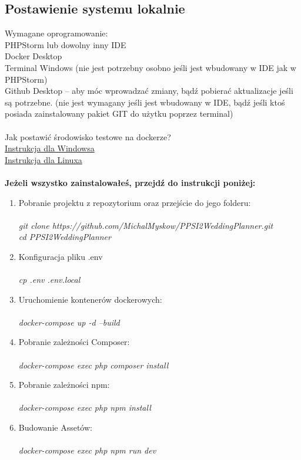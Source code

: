 \documentclass{article}
\begin{document}
\subsection{Postawienie systemu lokalnie}
Wymagane oprogramowanie:\\
PHPStorm lub dowolny inny IDE\\
Docker Desktop\\
Terminal Windows (nie jest potrzebny osobno jeśli jest wbudowany w IDE jak w PHPStorm)\\
Github Desktop – aby móc wprowadzać zmiany, bądź pobierać aktualizacje jeśli są potrzebne. (nie jest wymagany  jeśli jest wbudowany w IDE, bądź jeśli ktoś posiada zainstalowany pakiet GIT do użytku poprzez terminal)\\\\
Jak postawić środowisko testowe na dockerze?\\
\href{https://docs.docker.com/docker-for-windows/}{Instrukcja dla Windowsa}\\
\href{https://docs.docker.com/compose/install/}{Instrukcja dla Linuxa}\\\\
\textbf{Jeżeli wszystko zainstalowałeś, przejdź do instrukcji poniżej:}
\begin{enumerate}
    \item Pobranie projektu z repozytorium oraz przejście do jego folderu: \\\\
    \emph{ git clone https://github.com/MichalMyskow/PPSI2\textunderscore Wedding\textunderscore Planner.git} \\
   			 \emph{ cd PPSI2\textunderscore Wedding\textunderscore Planner} \\
    \item Konfiguracja pliku .env\\\\
    \emph{cp .env .env.local} \\
    \item Uruchomienie kontenerów dockerowych:\\\\
    \emph{docker-compose up -d --build}\\
    \item Pobranie zależności Composer:\\\\
    \emph{docker-compose exec php composer install}\\
 			 \item Pobranie zależności npm:\\\\
 		   \emph{docker-compose exec php npm install}\\
 			 \item Budowanie Assetów:\\\\
 		   \emph{docker-compose exec php npm run dev}\\
    \end{enumerate}
\end{document}
